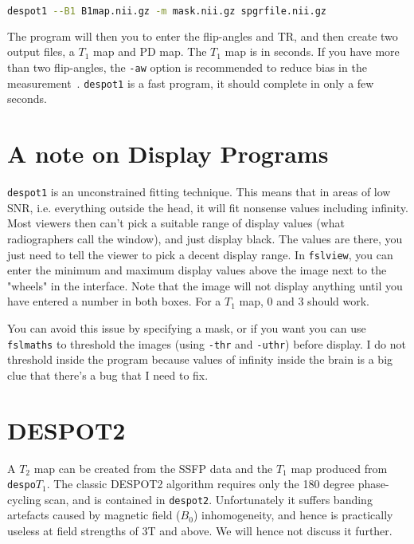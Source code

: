 \documentclass{report}
\begin{document}
\begin{lstlisting}[language=sh]
despot1 --B1 B1map.nii.gz -m mask.nii.gz spgrfile.nii.gz
\end{lstlisting}

The program will then you to enter the flip-angles and TR, and then create two output files, a $T_1$ map and PD map. The $T_1$ map is in seconds. If you have more than two flip-angles, the \texttt{-aw} option is recommended to reduce bias in the measurement~\cite{Pierpaoli:2008}. \texttt{despot1} is a fast program, it should complete in only a few seconds.

\section{A note on Display Programs}

\texttt{despot1} is an unconstrained fitting technique. This means that in areas of low SNR, i.e. everything outside the head, it will fit nonsense values including infinity. Most viewers then can't pick a suitable range of display values (what radiographers call the window), and just display black. The values are there, you just need to tell the viewer to pick a decent display range. In \texttt{fslview}, you can enter the minimum and maximum display values above the image next to the "wheels" in the interface. Note that the image will not display anything until you have entered a number in both boxes. For a $T_1$ map, 0 and 3 should work.

You can avoid this issue by specifying a mask, or if you want you can use \texttt{fslmaths} to threshold the images (using \texttt{-thr} and \texttt{-uthr}) before display. I do not threshold inside the program because values of infinity inside the brain is a big clue that there's a bug that I need to fix.

\section{DESPOT2}

A $T_2$ map can be created from the SSFP data and the $T_1$ map produced from \texttt{despo$T_1$}. The classic DESPOT2 algorithm requires only the 180 degree phase-cycling scan, and is contained in \texttt{despot2}. Unfortunately it suffers banding artefacts caused by magnetic field ($B_0$) inhomogeneity, and hence is practically useless at field strengths of 3T and above. We will hence not discuss it further.
\end{document}
